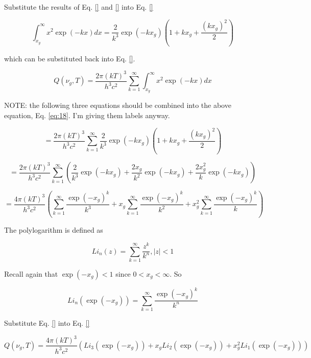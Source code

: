 \documentclass[letterpaper,12pt]{article}
\begin{document}
Substitute the results of Eq. \ref{} and \ref{} into Eq. \ref{}

\begin{equation} \label{eq:17}
\int_{x_{g}}^{\infty} x^{2} \exp(-kx) dx = \frac{2}{k^{3}} \exp(-kx_{g}) \left( 1 + kx_{g} + \frac{ (kx_{g})^{2} }{2} \right)
\end{equation}

\noindent which can be substituted back into Eq. \ref{}.

\begin{equation} \label{eq:18}
Q(\nu_{g}, T) = \frac{2\pi (kT)^{3}}{h^{3} c^{2}} \sum_{k = 1}^{\infty} \int_{x_{g}}^{\infty} x^{2} \exp(-kx) dx
\end{equation}

\noindent NOTE: the following three equations should be combined into the above equation, Eq. \ref{eq:18}. I'm giving them labels anyway.

\begin{equation} \label{eq:19}
= \frac{2\pi (kT)^{3}}{h^{3} c^{2}} \sum_{k = 1}^{\infty} \frac{2}{k^{3}} \exp(-kx_{g}) \left( 1 + kx_{g} + \frac{ (kx_{g})^{2} }{2} \right)
\end{equation}

\begin{equation} \label{eq:20}
= \frac{2\pi (kT)^{3}}{h^{3} c^{2}} \sum_{k = 1}^{\infty} \left( \frac{2}{k^{3}} \exp(-kx_{g}) + \frac{2x_{g}}{k^{2}} \exp(-kx_{g}) + \frac{2x_{g}^{2}}{k} \exp(-kx_{g}) \right)
\end{equation}

\begin{equation} \label{eq:21}
= \frac{4\pi (kT)^{3}}{h^{3} c^{2}} \left(\sum_{k = 1}^{\infty} \frac{\exp(-x_{g})^{k}}{k^{3}} + x_{g} \sum_{k = 1}^{\infty} \frac{\exp(-x_{g})^{k}}{k^{2}} + x_{g}^{2} \sum_{k = 1}^{\infty} \frac{\exp(-x_{g})^{k}}{k} \right) 
\end{equation}

The polylogarithm is defined as

\begin{equation} \label{eq:22}
Li_{n}(z) = \sum_{k = 1}^{\infty} \frac{z^{k}}{k^{n}}, |z| < 1
\end{equation}

Recall again that $\exp(-x_{g}) < 1$ since $0 < x_{g} < \infty$. So

\begin{equation} \label{eq:23}
Li_{n} \left(\exp(-x_{g}) \right) = \sum_{k = 1}^{\infty} \frac{\exp(-x_{g})^{k}}{k^{n}}
\end{equation}

Substitute Eq. \ref{} into Eq. \ref{}

\begin{equation} \label{eq:24}
Q(\nu_{g}, T) = \frac{4\pi (kT)^{3}}{h^{3} c^{2}} \left(Li_{3}(\exp(-x_{g})) + x_{g} Li_{2}(\exp(-x_{g})) + x_{g}^{2} Li_{1}(\exp(-x_{g})) \right) 
\end{equation}


% 
% 
\end{document}
